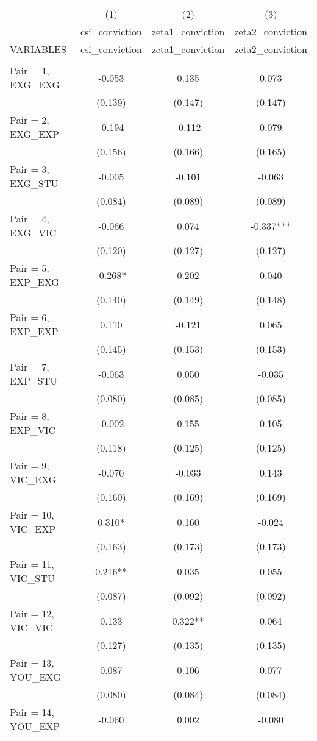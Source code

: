 \documentclass[]{article}
\begin{document}
\begin{tabular}{lccc} \hline
 & (1) & (2) & (3) \\
 & csi\_conviction & zeta1\_conviction & zeta2\_conviction \\
VARIABLES & csi\_conviction & zeta1\_conviction & zeta2\_conviction \\ \hline
 &  &  &  \\
Pair = 1, EXG\_EXG & -0.053 & 0.135 & 0.073 \\
 & (0.139) & (0.147) & (0.147) \\
Pair = 2, EXG\_EXP & -0.194 & -0.112 & 0.079 \\
 & (0.156) & (0.166) & (0.165) \\
Pair = 3, EXG\_STU & -0.005 & -0.101 & -0.063 \\
 & (0.084) & (0.089) & (0.089) \\
Pair = 4, EXG\_VIC & -0.066 & 0.074 & -0.337*** \\
 & (0.120) & (0.127) & (0.127) \\
Pair = 5, EXP\_EXG & -0.268* & 0.202 & 0.040 \\
 & (0.140) & (0.149) & (0.148) \\
Pair = 6, EXP\_EXP & 0.110 & -0.121 & 0.065 \\
 & (0.145) & (0.153) & (0.153) \\
Pair = 7, EXP\_STU & -0.063 & 0.050 & -0.035 \\
 & (0.080) & (0.085) & (0.085) \\
Pair = 8, EXP\_VIC & -0.002 & 0.155 & 0.105 \\
 & (0.118) & (0.125) & (0.125) \\
Pair = 9, VIC\_EXG & -0.070 & -0.033 & 0.143 \\
 & (0.160) & (0.169) & (0.169) \\
Pair = 10, VIC\_EXP & 0.310* & 0.160 & -0.024 \\
 & (0.163) & (0.173) & (0.173) \\
Pair = 11, VIC\_STU & 0.216** & 0.035 & 0.055 \\
 & (0.087) & (0.092) & (0.092) \\
Pair = 12, VIC\_VIC & 0.133 & 0.322** & 0.064 \\
 & (0.127) & (0.135) & (0.135) \\
Pair = 13, YOU\_EXG & 0.087 & 0.106 & 0.077 \\
 & (0.080) & (0.084) & (0.084) \\
Pair = 14, YOU\_EXP & -0.060 & 0.002 & -0.080 \\

\end{tabular}
\end{document}
